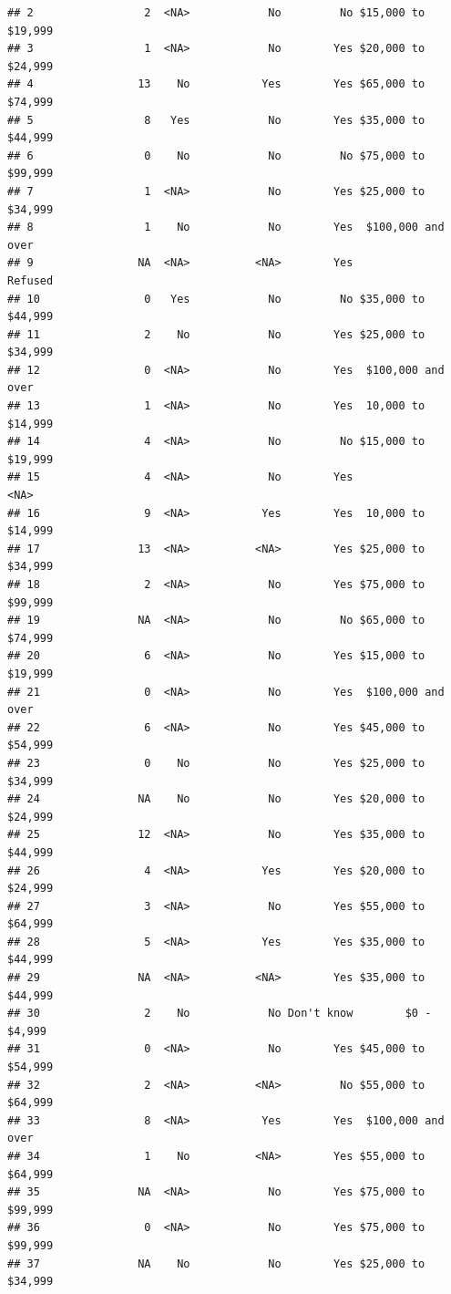 \documentclass[man]{apa6}
\begin{document}
\begin{verbatim}
## 2                 2  <NA>            No         No $15,000 to $19,999
## 3                 1  <NA>            No        Yes $20,000 to $24,999
## 4                13    No           Yes        Yes $65,000 to $74,999
## 5                 8   Yes            No        Yes $35,000 to $44,999
## 6                 0    No            No         No $75,000 to $99,999
## 7                 1  <NA>            No        Yes $25,000 to $34,999
## 8                 1    No            No        Yes  $100,000 and over
## 9                NA  <NA>          <NA>        Yes            Refused
## 10                0   Yes            No         No $35,000 to $44,999
## 11                2    No            No        Yes $25,000 to $34,999
## 12                0  <NA>            No        Yes  $100,000 and over
## 13                1  <NA>            No        Yes  10,000 to $14,999
## 14                4  <NA>            No         No $15,000 to $19,999
## 15                4  <NA>            No        Yes               <NA>
## 16                9  <NA>           Yes        Yes  10,000 to $14,999
## 17               13  <NA>          <NA>        Yes $25,000 to $34,999
## 18                2  <NA>            No        Yes $75,000 to $99,999
## 19               NA  <NA>            No         No $65,000 to $74,999
## 20                6  <NA>            No        Yes $15,000 to $19,999
## 21                0  <NA>            No        Yes  $100,000 and over
## 22                6  <NA>            No        Yes $45,000 to $54,999
## 23                0    No            No        Yes $25,000 to $34,999
## 24               NA    No            No        Yes $20,000 to $24,999
## 25               12  <NA>            No        Yes $35,000 to $44,999
## 26                4  <NA>           Yes        Yes $20,000 to $24,999
## 27                3  <NA>            No        Yes $55,000 to $64,999
## 28                5  <NA>           Yes        Yes $35,000 to $44,999
## 29               NA  <NA>          <NA>        Yes $35,000 to $44,999
## 30                2    No            No Don't know        $0 - $4,999
## 31                0  <NA>            No        Yes $45,000 to $54,999
## 32                2  <NA>          <NA>         No $55,000 to $64,999
## 33                8  <NA>           Yes        Yes  $100,000 and over
## 34                1    No          <NA>        Yes $55,000 to $64,999
## 35               NA  <NA>            No        Yes $75,000 to $99,999
## 36                0  <NA>            No        Yes $75,000 to $99,999
## 37               NA    No            No        Yes $25,000 to $34,999

\end{verbatim}
\end{document}
